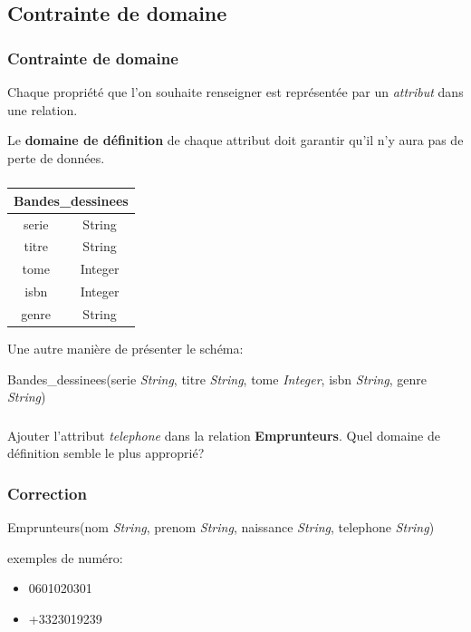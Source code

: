 \documentclass[svgnames,11pt]{beamer}
\begin{document}
\subsection{Contrainte de domaine}
\begin{frame}
    \frametitle{Contrainte de domaine}

    Chaque propriété que l'on souhaite renseigner est représentée par un \emph{attribut} dans une relation. 
    \begin{aretenir}[]
        Le \textbf{domaine de définition} de chaque attribut doit garantir qu'il n'y aura pas de perte de données.
    \end{aretenir}

\end{frame}
\begin{frame}
    \frametitle{}

    \begin{center}
        \begin{tabular}{|cc|}
        \hline 
        \multicolumn{2}{|c|}{Bandes\_dessinees} \\ 
        \hline 
        serie & String \\ 
        titre & String \\ 
        tome & Integer \\ 
        isbn & Integer \\ 
        genre & String \\ 
        \hline 
        \end{tabular} 
        \end{center}
        Une autre manière de présenter le schéma:
        
        Bandes\_dessinees(serie \emph{String}, titre \emph{String}, tome \emph{Integer}, isbn \emph{String}, genre \emph{String})

\end{frame}
\begin{frame}
    \frametitle{}

    \begin{activite}
        Ajouter l'attribut \emph{telephone} dans la relation \textbf{Emprunteurs}. Quel domaine de définition semble le plus approprié?
        \end{activite}

\end{frame}
\begin{frame}
    \frametitle{Correction}

    Emprunteurs(nom \emph{String}, prenom \emph{String}, naissance \emph{String}, telephone \emph{String})

    exemples de numéro:
    \begin{itemize}
        \item 0601020301
        \item +3323019239
    \end{itemize}
\end{frame}
\end{document}
